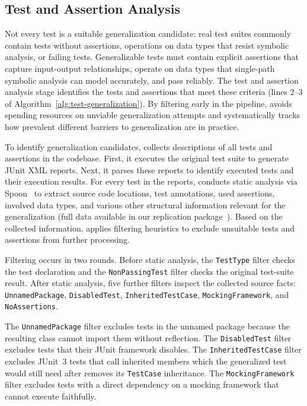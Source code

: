 \subsection{Test and Assertion Analysis}%
\label{sec:test-assertion-analysis}

Not every test is a suitable generalization candidate:
real test suites commonly contain tests without assertions,
operations on data types that resist symbolic analysis,
or failing tests.
Generalizable tests must contain explicit assertions that capture input-output relationships,
operate on data types that single-path symbolic analysis can model accurately,
and pass reliably.
The test and assertion analysis stage identifies the tests and assertions that meet these criteria
(lines 2--3 of Algorithm~\ref{alg:test-generalization}).
By filtering early in the pipeline,
\ToolTeralizer{} avoids spending resources on unviable generalization attempts
and systematically tracks how prevalent different barriers to generalization are in practice.

To identify generalization candidates, \ToolTeralizer{} collects descriptions of all tests and assertions in the codebase.
First, it executes the original test suite to generate JUnit XML reports.
Next, it parses these reports to identify executed tests and their execution results.
For every test in the reports, \ToolTeralizer{} conducts static analysis via Spoon~\cite{pawlak_2016_spoon}
to extract source code locations, test annotations, used assertions, involved data types,
and various other structural information relevant for the generalization
(full data available in our replication package~\cite{replicationpackage}).
Based on the collected information, \ToolTeralizer{} applies filtering heuristics
to exclude unsuitable tests and assertions from further processing.

Filtering occurs in two rounds. Before static analysis, the \texttt{TestType} filter checks the
test declaration and the \texttt{NonPassingTest} filter checks the original test-suite result.
After static analysis, five further filters inspect the collected source facts:
\texttt{UnnamedPackage}, \texttt{DisabledTest}, \texttt{InheritedTestCase},
\texttt{MockingFramework}, and \texttt{NoAssertions}.

The \texttt{UnnamedPackage} filter excludes tests in the unnamed package because the resulting
\ToolJqwik{} class cannot import them without reflection. The \texttt{DisabledTest} filter excludes tests
that their JUnit framework disables. The \texttt{InheritedTestCase} filter excludes JUnit~3 tests
that call inherited members which the generalized test would still need after \ToolTeralizer{}
removes its \texttt{TestCase} inheritance. The \texttt{MockingFramework} filter excludes tests with
a direct dependency on a mocking framework that \ToolJPF{} cannot execute faithfully.


